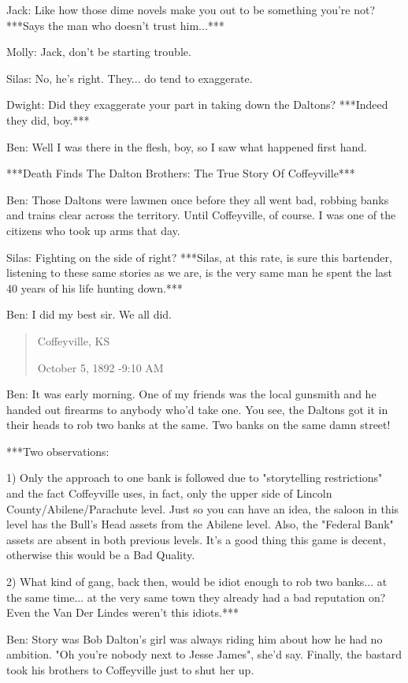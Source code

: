\documentclass{article}
\begin{document}
Jack: Like how those dime novels make you out to be something you're not? ***Says the man who doesn't trust him...***

Molly: Jack, don't be starting trouble.

Silas: No, he's right. They... do tend to exaggerate.

Dwight: Did they exaggerate your part in taking down the Daltons? ***Indeed they did, boy.***

Ben: Well I was there in the flesh, boy, so I saw what happened first hand.

***Death Finds The Dalton Brothers: The True Story Of Coffeyville***

Ben: Those Daltons were lawmen once before they all went bad, robbing banks and trains clear across the territory. Until Coffeyville, of course. I was one of the citizens who took up arms that day.

Silas: Fighting on the side of right? ***Silas, at this rate, is sure this bartender, listening to these same stories as we are, is the very same man he spent the last 40 years of his life hunting down.***

Ben: I did my best sir. We all did.

\begin{quote}
    Coffeyville, KS
    
    October 5, 1892 -9:10 AM
\end{quote}

Ben: It was early morning. One of my friends was the local gunsmith and he handed out firearms to anybody who'd take one. You see, the Daltons got it in their heads to rob two banks at the same. Two banks on the same damn street!

***Two observations:

1) Only the approach to one bank is followed due to "storytelling restrictions" and the fact Coffeyville uses, in fact, only the upper side of Lincoln County/Abilene/Parachute level. Just so you can have an idea, the saloon in this level has the Bull's Head assets from the Abilene level. Also, the "Federal Bank" assets are absent in both previous levels. It's a good thing this game is decent, otherwise this would be a Bad Quality.

2) What kind of gang, back then, would be idiot enough to rob two banks... at the same time... at the very same town they already had a bad reputation on? Even the Van Der Lindes weren't this idiots.***

Ben: Story was Bob Dalton's girl was always riding him about how he had no ambition. "Oh you're nobody next to Jesse James", she'd say. Finally, the bastard took his brothers to Coffeyville just to shut her up.
\end{document}
